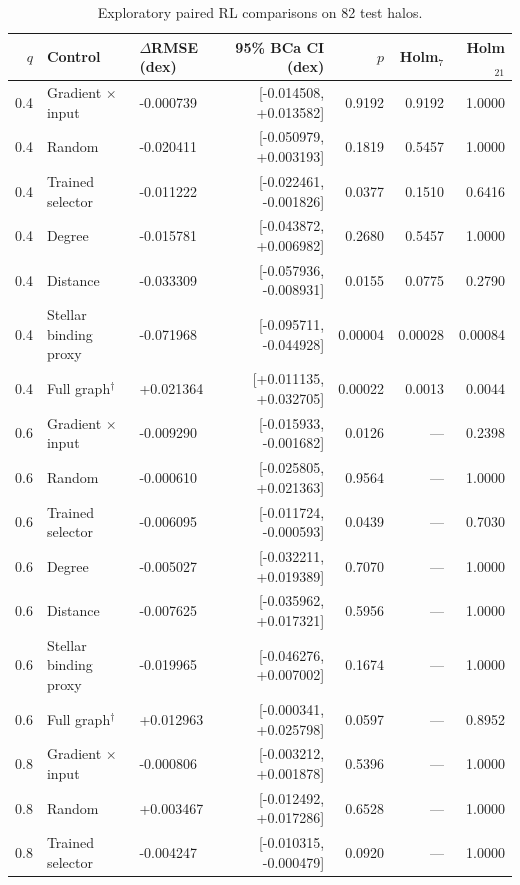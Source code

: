 \begin{table}[t]
\centering
\small
\caption{Exploratory paired RL comparisons on 82 test halos.}
\label{tab:cosmic-3}
\setlength{\tabcolsep}{4pt}
\begin{tabular}{rllrrrr}
\toprule
$q$ & Control & $\Delta$RMSE (dex) & 95\% BCa CI (dex) & $p$ & Holm$_7$ & Holm$_{21}$ \\
\midrule
0.4 & Gradient $\times$ input & -0.000739 & [-0.014508, +0.013582] & 0.9192 & 0.9192 & 1.0000 \\
0.4 & Random & -0.020411 & [-0.050979, +0.003193] & 0.1819 & 0.5457 & 1.0000 \\
0.4 & Trained selector & -0.011222 & [-0.022461, -0.001826] & 0.0377 & 0.1510 & 0.6416 \\
0.4 & Degree & -0.015781 & [-0.043872, +0.006982] & 0.2680 & 0.5457 & 1.0000 \\
0.4 & Distance & -0.033309 & [-0.057936, -0.008931] & 0.0155 & 0.0775 & 0.2790 \\
0.4 & Stellar binding proxy & -0.071968 & [-0.095711, -0.044928] & 0.00004 & 0.00028 & 0.00084 \\
0.4 & Full graph$^\dagger$ & +0.021364 & [+0.011135, +0.032705] & 0.00022 & 0.0013 & 0.0044 \\
0.6 & Gradient $\times$ input & -0.009290 & [-0.015933, -0.001682] & 0.0126 & --- & 0.2398 \\
0.6 & Random & -0.000610 & [-0.025805, +0.021363] & 0.9564 & --- & 1.0000 \\
0.6 & Trained selector & -0.006095 & [-0.011724, -0.000593] & 0.0439 & --- & 0.7030 \\
0.6 & Degree & -0.005027 & [-0.032211, +0.019389] & 0.7070 & --- & 1.0000 \\
0.6 & Distance & -0.007625 & [-0.035962, +0.017321] & 0.5956 & --- & 1.0000 \\
0.6 & Stellar binding proxy & -0.019965 & [-0.046276, +0.007002] & 0.1674 & --- & 1.0000 \\
0.6 & Full graph$^\dagger$ & +0.012963 & [-0.000341, +0.025798] & 0.0597 & --- & 0.8952 \\
0.8 & Gradient $\times$ input & -0.000806 & [-0.003212, +0.001878] & 0.5396 & --- & 1.0000 \\
0.8 & Random & +0.003467 & [-0.012492, +0.017286] & 0.6528 & --- & 1.0000 \\
0.8 & Trained selector & -0.004247 & [-0.010315, -0.000479] & 0.0920 & --- & 1.0000 \\

\end{tabular}
\end{table}

